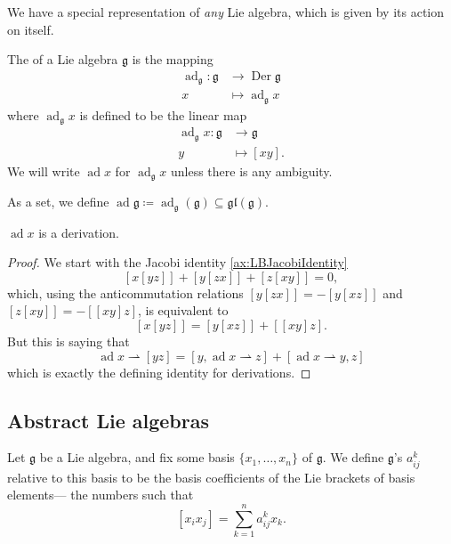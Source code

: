 \documentclass{article}
\newcommand{\lb}[1]{\ensuremath{\left[{#1}\right]}}
\DeclareMathOperator{\Der}{Der}
\DeclareMathOperator{\ad}{ad}
\newcommand{\frkg}{{\ensuremath{\mathfrak{g}}}}
\newcommand{\glalg}{\ensuremath{\mathfrak{gl}}}
\begin{document}
We have a special representation of \textit{any} Lie algebra, which is given by its action on itself.

\begin{definition}
    The  of a Lie algebra $\frkg$ is the mapping
    \begin{align*}
        \ad_\frkg:
        \frkg 
        &\to
        \Der \frkg
        \\
        x 
        &\mapsto 
        \ad_\frkg x
    \end{align*}
    where $\ad_\frkg x$ is defined to be the linear map
    \begin{align*}
        \ad_\frkg x: 
        \frkg 
        &\to 
        \frkg \\
        y 
        &\mapsto
        \lb{xy}.
    \end{align*}
    We will write $\ad x$ for $\ad_\frkg x$ unless there is any ambiguity.

    As a set, we define $\ad \frkg \coloneq \ad_\frkg(\frkg) \subseteq \glalg(\frkg)$.
\end{definition}

\begin{proposition}
    $\ad x$ is a derivation.
\end{proposition}
\begin{proof}
    We start with the Jacobi identity \ref{ax:LBJacobiIdentity}
    \[
        \lb{x\lb{yz}} + \lb{y\lb{zx}} + \lb{z\lb{xy}}
        =
        0,
    \]
    which, using the anticommutation relations $\lb{y\lb{zx}} = -\lb{y\lb{xz}}$ and $\lb{z\lb{xy}} = -\lb{\lb{xy}z}$, is equivalent to
    \[
        \lb{x\lb{yz}}
        =
        \lb{y\lb{xz}} + \lb{\lb{xy}{z}}.
    \]
    But this is saying that
    \[
        \ad x \rightharpoonup \lb{yz}
        =
        \lb{y, \ad x \rightharpoonup z}
        +
        \lb{\ad x \rightharpoonup y, z}
    \]
    which is exactly the defining identity for derivations.
\end{proof}


\subsection{Abstract Lie algebras}

\begin{definition}
    Let $\frkg$ be a Lie algebra, and fix some basis $\{x_1,\ldots,x_n\}$ of $\frkg$.
    We define $\frkg$'s  $a^k_{ij}$ relative to this basis to be the basis coefficients of the Lie brackets of basis elements--- the numbers such that
    \[
        \lb{x_ix_j}
        =
        \sum_{k=1}^n
        a^k_{ij}
        x_k.
    \]
\end{definition}
\end{document}
